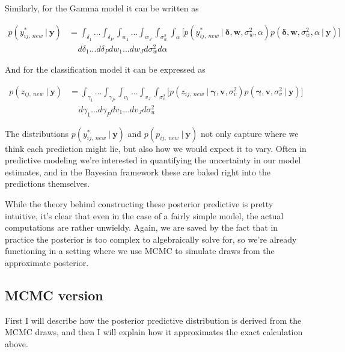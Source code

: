 \documentclass[12pt,twoside]{reedthesis}
\begin{document}
Similarly, for the Gamma model it can be written as

\[
\begin{aligned}
p(y^*_{ij, \ new} \ | \ \mathbf{y}) &=  \int_{\delta_1}  \dots \int_{\delta_P} \int_{w_1} \dots \int_{w_J} \int_{\sigma_w^2} \int_{\alpha} \bigg[p(y^*_{ij, \ new} \ | \ \boldsymbol{\delta}, \boldsymbol{w}, \sigma_w^2, \alpha)p(\boldsymbol{\delta}, \mathbf{w}, \sigma_w^2, \alpha \ | \ \mathbf{y})\bigg] \\
& \ \ \ \ \ d\delta_1 ...  d\delta_Pdw_1...dw_Jd\sigma_w^2d\alpha
\end{aligned}
\]

And for the classification model it can be expressed as

\[
\begin{aligned}
p(z_{ij, \ new} \ | \ \mathbf{y}) &=  \int_{\gamma_1}  \dots \int_{\gamma_P} \int_{v_1} \dots \int_{v_J} \int_{\sigma_v^2}  \bigg[p(z_{ij, \ new} \ | \ \boldsymbol{\gamma}, \boldsymbol{v}, \sigma_v^2)p(\boldsymbol{\gamma}, \mathbf{v}, \sigma_v^2 \ | \ \mathbf{y})\bigg] \\
& \ \ \ \ \ d\gamma_1 ...  d\gamma_Pdv_1...dv_Jd\sigma_u^2
\end{aligned}
\]

The distributions \(p(y^*_{ij, \ new} \ | \ \mathbf{y})\) and \(p(p_{ij, \ new}\ | \ \mathbf{y})\) not only capture where we think each prediction might lie, but also how we would expect it to vary. Often in predictive modeling we're interested in quantifying the uncertainty in our model estimates, and in the Bayesian framework these are baked right into the predictions themselves.

While the theory behind constructing these posterior predictive is pretty intuitive, it's clear that even in the case of a fairly simple model, the actual computations are rather unwieldy. Again, we are saved by the fact that in practice the posterior is too complex to algebraically solve for, so we're already functioning in a setting where we use MCMC to simulate draws from the approximate posterior.

\hypertarget{mcmc-version}{%
\subsection{MCMC version}\label{mcmc-version}}

First I will describe how the posterior predictive distribution is derived from the MCMC draws, and then I will explain how it approximates the exact calculation above.
\end{document}
